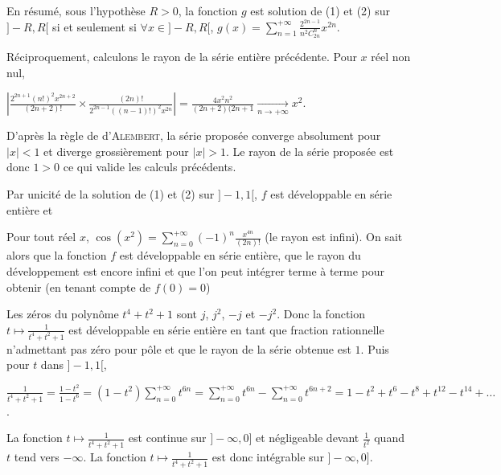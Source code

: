{{En résumé, sous l'hypothèse $R > 0$, la fonction $g$ est solution de (1) et (2) sur $]-R,R[$ si et seulement si $\forall x\in]-R,R[$, $g(x)=\sum_{n=1}^{+\infty}\frac{2^{2n-1}}{n^2C_{2n}^n}x^{2n}$.

Réciproquement, calculons le rayon de la série entière précédente. Pour $x$ réel non nul,

\begin{center} 
$\left|\frac{2^{2n+1}(n!)^2x^{2n+2}}{(2n+2)!}\times\frac{(2n)!}{2^{2n-1}((n-1)!)^2x^{2n}}\right| = \frac{4x^2n^2}{(2n+2)(2n+1}\underset{n\rightarrow+\infty}{\rightarrow}x^2$.
\end{center}

D'après la règle de d'\textsc{Alembert}, la série proposée converge absolument pour $|x| < 1$ et diverge grossièrement pour $|x|> 1$. Le rayon de la série proposée est donc $1>0$ ce qui valide les calculs précédents.

Par unicité de la solution de (1) et (2) sur $]-1,1[$, $f$ est développable en série entière et

\begin{center}
\shadowbox{
$\forall x\in]-1,1[$, $\Arcsin^2x=\sum_{n=1}^{+\infty}\frac{2^{2n-1}}{n^2C_{2n}^n}x^{2n}$.
}
\end{center}
Pour tout réel $x$, $\cos(x^2) =\sum_{n=0}^{+\infty}(-1)^n\frac{x^{4n}}{(2n)!}$ (le rayon est infini).
On sait alors que la fonction $f$ est développable en série entière, que le rayon du développement est encore infini et que l'on peut intégrer terme à terme pour obtenir (en tenant compte de $f(0)=0$) 

\begin{center}
\end{center}
Les zéros du polynôme $t^4+t^2 + 1$ sont  $j$, $j^2$, $-j$ et $-j^2$. Donc la fonction $t\mapsto\frac{1}{t^4+t^2+1}$ est développable en série entière en tant que fraction rationnelle n'admettant pas zéro pour pôle et que le rayon de la série obtenue est $1$. Puis pour $t$ dans $]-1,1[$, 

\begin{center}
$\frac{1}{t^4+t^2+1}=\frac{1-t^2}{1-t^6}=(1-t^2)\sum_{n=0}^{+\infty}t^{6n}=\sum_{n=0}^{+\infty}t^{6n}-\sum_{n=0}^{+\infty}t^{6n+2}=1-t^2+t^6-t^8+t^{12}-t^{14}+\ldots$.
\end{center}

La fonction $t\mapsto\frac{1}{t^4+t^2+1}$ est continue sur $]-\infty,0]$ et négligeable devant $\frac{1}{t^2}$ quand $t$ tend vers $-\infty$. La fonction $t\mapsto\frac{1}{t^4+t^2+1}$ est donc intégrable sur $]-\infty,0]$.

}}
